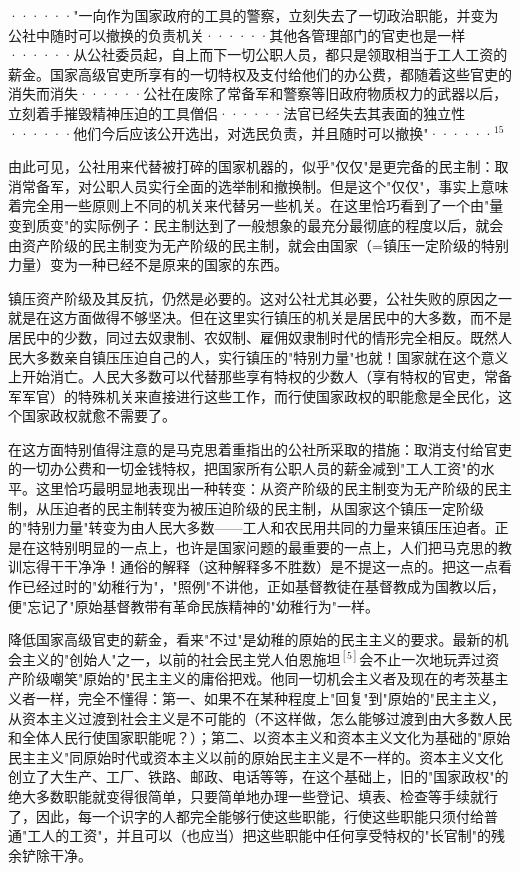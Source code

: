 ······"一向作为国家政府的工具的警察，立刻失去了一切政治职能，并变为公社中随时可以撤换的负责机关······\quad 其他各管理部门的官吏也是一样······\quad 从公社委员起，自上而下一切公职人员，都只是领取相当于{\kaishu 工人工资}的薪金。国家高级官吏所享有的一切特权及支付给他们的办公费，都随着这些官吏的消失而消失······\quad 公社在废除了常备军和警察等旧政府物质权力的武器以后，立刻着手摧毁精神压迫的工具僧侣······\quad 法官已经失去其表面的独立性······他们今后应该公开选出，对选民负责，并且随时可以撤换"······$^{15}$

\normalsize
\leftskip=0mm
\pskip

由此可见，公社用来代替被打碎的国家机器的，似乎"仅仅"是更完备的民主制：取消常备军，对公职人员实行全面的选举制和撤换制。但是这个"仅仅"，事实上意味着完全用一些原则上不同的机关来代替另一些机关。在这里恰巧看到了一个由"量变到质变"的实际例子：民主制达到了一般想象的最充分最彻底的程度以后，就会由资产阶级的民主制变为无产阶级的民主制，就会由国家（=镇压一定阶级的特别力量）变为一种已经不是原来的国家的东西。

镇压资产阶级及其反抗，仍然是必要的。这对公社尤其必要，公社失败的原因之一就是在这方面做得不够坚决。但在这里实行镇压的机关是居民中的大多数，而不是居民中的少数，同过去奴隶制、农奴制、雇佣奴隶制时代的情形完全相反。既然人民大多数{\kaishu 亲自}镇压压迫自己的人，实行镇压的"特别力量"也就！国家就在这个意义上{\kaishu 开始消亡}。人民大多数可以代替那些享有特权的少数人（享有特权的官吏，常备军军官）的特殊机关来直接进行这些工作，而行使国家政权的职能愈是全民化，这个国家政权就愈不需要了。

在这方面特别值得注意的是马克思着重指出的公社所采取的措施：取消支付给官吏的一切办公费和一切金钱特权，把国家所有公职人员的薪金减到"工人工资"的水平。这里恰巧最明显地表现出一种{\kaishu 转变}：从资产阶级的民主制变为无产阶级的民主制，从压迫者的民主制转变为被压迫阶级的民主制，从国家这个镇压一定阶级的"特别力量"转变为由人民大多数——工人和农民用{\kaishu 共同的力量}来镇压压迫者。正是在这特别明显的一点上，也许是国家问题的最重要的一点上，人们把马克思的教训忘得干干净净！通俗的解释（这种解释多不胜数）是不提这一点的。把这一点看作已经过时的"幼稚行为"，"照例"不讲他，正如基督教徒在基督教成为国教以后，便"忘记了"原始基督教带有革命民族精神的"幼稚行为"一样。

降低国家高级官吏的薪金，看来"不过"是幼稚的原始的民主主义的要求。最新的机会主义的"创始人"之一，以前的社会民主党人伯恩施坦$^{[5]}$会不止一次地玩弄过资产阶级嘲笑"原始的"民主主义的庸俗把戏。他同一切机会主义者及现在的考茨基主义者一样，完全不懂得：第一、如果不在某种程度上"回复"到"原始的"民主主义，从资本主义过渡到社会主义{\kaishu 是不可能的}（不这样做，怎么能够过渡到由大多数人民和全体人民行使国家职能呢？）；第二、以资本主义和资本主义文化为基础的"原始民主主义"同原始时代或资本主义以前的原始民主主义是不一样的。资本主义文化{\kaishu 创立}了大生产、工厂、铁路、邮政、电话等等，在这个基础上，旧的"国家政权"的绝大多数职能就变得很简单，只要简单地办理一些登记、填表、检查等手续就行了，因此，每一个识字的人都完全能够行使这些职能，行使这些职能只须付给普通"工人的工资"，并且可以（也应当）把这些职能中任何享受特权的"长官制"的残余铲除干净。

